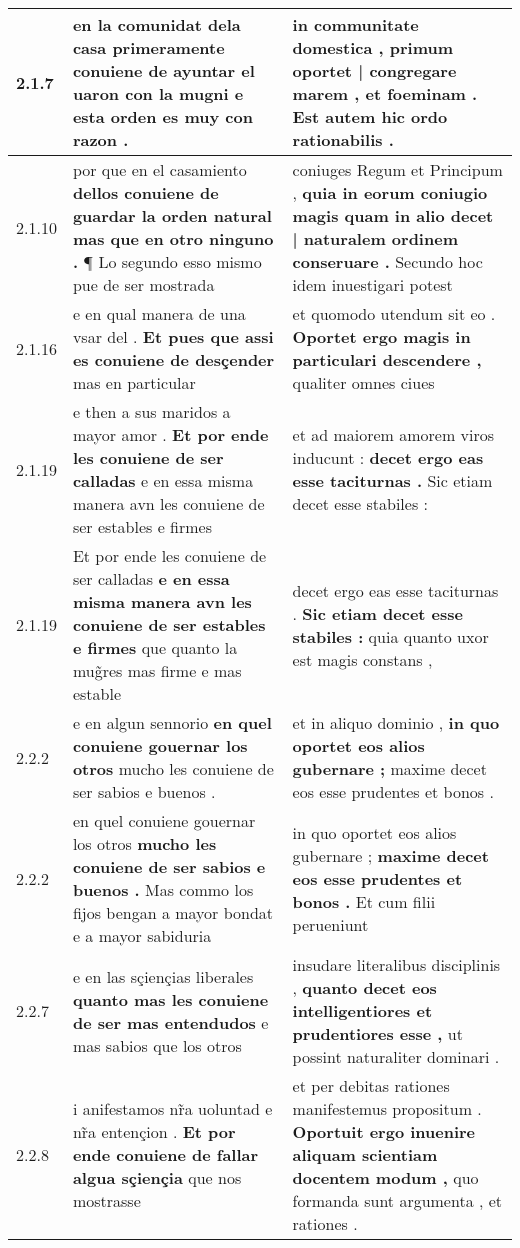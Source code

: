 \begin{tabular}{|p{1cm}|p{6.5cm}|p{6.5cm}|}
2.1.7 & en la comunidat dela casa \textbf{ primeramente conuiene de ayuntar el uaron con la mugni } e esta orden es muy con razon . & in communitate domestica , \textbf{ primum oportet | congregare marem , et foeminam . } Est autem hic ordo rationabilis . \\\hline
2.1.10 & por que en el casamiento \textbf{ dellos conuiene de guardar la orden natural mas que en otro ninguno . } ¶ Lo segundo esso mismo pue de ser mostrada & coniuges Regum et Principum , \textbf{ quia in eorum coniugio magis quam in alio decet | naturalem ordinem conseruare . } Secundo hoc idem inuestigari potest \\\hline
2.1.16 & e en qual manera de una vsar del . \textbf{ Et pues que assi es conuiene de desçender } mas en particular & et quomodo utendum sit eo . \textbf{ Oportet ergo magis in particulari descendere , } qualiter omnes ciues \\\hline
2.1.19 & e then a sus maridos a mayor amor . \textbf{ Et por ende les conuiene de ser calladas } e en essa misma manera avn les conuiene de ser estables e firmes & et ad maiorem amorem viros inducunt : \textbf{ decet ergo eas esse taciturnas . } Sic etiam decet esse stabiles : \\\hline
2.1.19 & Et por ende les conuiene de ser calladas \textbf{ e en essa misma manera avn les conuiene de ser estables e firmes } que quanto la mug̃res mas firme e mas estable & decet ergo eas esse taciturnas . \textbf{ Sic etiam decet esse stabiles : } quia quanto uxor est magis constans , \\\hline
2.2.2 & e en algun sennorio \textbf{ en quel conuiene gouernar los otros } mucho les conuiene de ser sabios e buenos . & et in aliquo dominio , \textbf{ in quo oportet eos alios gubernare ; } maxime decet eos esse prudentes et bonos . \\\hline
2.2.2 & en quel conuiene gouernar los otros \textbf{ mucho les conuiene de ser sabios e buenos . } Mas commo los fijos bengan a mayor bondat e a mayor sabiduria & in quo oportet eos alios gubernare ; \textbf{ maxime decet eos esse prudentes et bonos . } Et cum filii perueniunt \\\hline
2.2.7 & e en las sçiençias liberales \textbf{ quanto mas les conuiene de ser mas entendudos } e mas sabios que los otros & insudare literalibus disciplinis , \textbf{ quanto decet eos intelligentiores et prudentiores esse , } ut possint naturaliter dominari . \\\hline
2.2.8 & i anifestamos nr̃a uoluntad e nr̃a entençion . \textbf{ Et por ende conuiene de fallar algua sçiençia } que nos mostrasse & et per debitas rationes manifestemus propositum . \textbf{ Oportuit ergo inuenire aliquam scientiam docentem modum , } quo formanda sunt argumenta , et rationes . \\\hline

\end{tabular}
